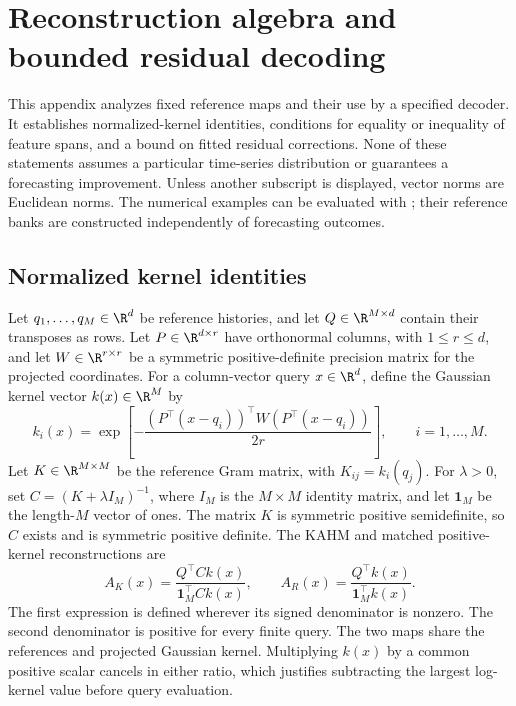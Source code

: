 \section{Reconstruction algebra and bounded residual decoding}
\label{app:reconstruction-mechanism}

This appendix analyzes fixed reference maps and their use by a specified
decoder. It establishes normalized-kernel identities, conditions for equality
or inequality of feature spans, and a bound on fitted residual corrections.
None of these statements assumes a particular time-series distribution or
guarantees a forecasting improvement. Unless another subscript is displayed,
vector norms are Euclidean norms. The numerical examples can be evaluated
with ; their reference
banks are constructed independently of forecasting outcomes.

\subsection{Normalized kernel identities}

Let $q_1,\ldots,q_M\in\R^d$ be reference histories, and let
$Q\in\R^{M\times d}$ contain their transposes as rows. Let
$P\in\R^{d\times r}$ have orthonormal columns, with $1\leq r\leq d$,
and let $W\in\R^{r\times r}$ be a symmetric positive-definite precision
matrix for the projected coordinates. For a column-vector query
$x\in\R^d$, define the Gaussian kernel vector $k(x)\in\R^M$ by
\[
 k_i(x)=\exp\!\left[-\frac{
 (P^\top(x-q_i))^\top W(P^\top(x-q_i))}{2r}\right],
 \qquad i=1,\ldots,M.
\]
Let $K\in\R^{M\times M}$ be the reference Gram matrix, with
$K_{ij}=k_i(q_j)$. For $\lambda>0$, set
$C=(K+\lambda I_M)^{-1}$, where $I_M$ is the $M\times M$ identity
matrix, and let $\mathbf1_M$ be the length-$M$ vector of ones.
The matrix $K$ is symmetric positive semidefinite, so $C$ exists and is
symmetric positive definite. The KAHM and matched positive-kernel
reconstructions are
\begin{equation}
 A_K(x)=\frac{Q^\top Ck(x)}{\mathbf1_M^\top Ck(x)},\qquad
 A_R(x)=\frac{Q^\top k(x)}{\mathbf1_M^\top k(x)}.
 \label{eq:mechanism-normalized-maps}
\end{equation}
The first expression is defined wherever its signed denominator is nonzero.
The second denominator is positive for every finite query. The two maps
share the references and projected Gaussian kernel. Multiplying $k(x)$
by a common positive scalar cancels in either ratio, which justifies
subtracting the largest log-kernel value before query evaluation.

